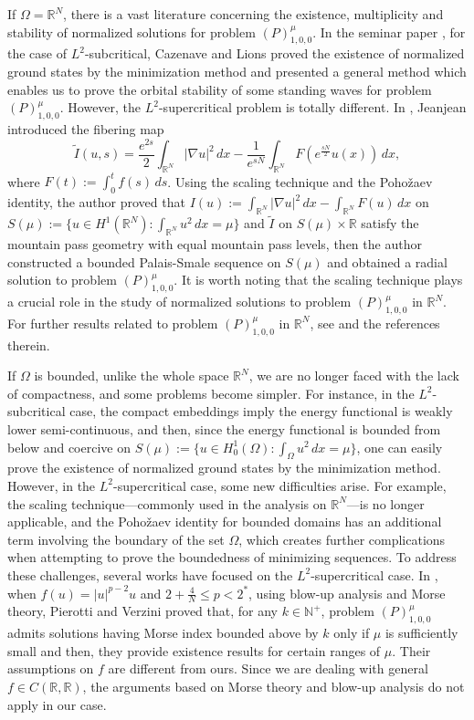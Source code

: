 \documentclass[11pt]{amsart}
\newcommand{\abs}[1]{\lvert#1\rvert}
\newcommand{\R}{\mathbb{R}}
\numberwithin{equation}{section}
\begin{document}
If $\Omega=\R^N$, there is a vast literature concerning the existence, multiplicity and stability of normalized solutions for problem $(P)^{\mu}_{1,0,0}$. In the seminar paper \cite{CL}, for the case of $L^{2}$-subcritical, Cazenave  and Lions proved the existence of normalized ground states by the minimization method and presented a general method which enables us to prove the orbital stability of some standing waves for problem $(P)^{\mu}_{1,0,0}$. However, the $L^{2}$-supercritical problem is
totally different. In \cite{jeanjean1}, Jeanjean introduced the fibering map
$$
\tilde{I}(u,s) = \frac{e^{2s}}{2}\int_{\R^N}\abs{\nabla u}^2\, dx-\frac{1}{e^{sN}}\int_{\R^N}F(e^\frac{sN}{2}u(x))\, dx,
$$
where $F(t):=\int_0^tf(s)\,ds$. Using the scaling technique and the Poho\v{z}aev identity, the author proved that $I(u):=\int_{\R^N}\abs{\nabla u}^2\, dx-\int_{\R^N}F(u)\, dx$ on $S(\mu):=\{u \in H^1(\R^N): \int_{\R^N}u^2\, dx=\mu\}$ and  $\tilde{I}$ on $S(\mu) \times\R$ satisfy the mountain pass geometry with equal mountain pass levels, then the author constructed a bounded Palais-Smale sequence on $S(\mu)$ and obtained a radial solution to problem $(P)^{\mu}_{1,0,0}$. It is worth noting that the scaling technique plays a crucial role  in the study of normalized solutions to problem $(P)^{\mu}_{1,0,0}$ in $\R^N$. For further results  related  to problem $(P)^{\mu}_{1,0,0}$ in $\R^N$,  see \cite{A21, CCM, AJ21, AlvesThin, BartschJeanjeanSaove, Bartschmolle, BartschSaove, valerio, Bartosz, BellazziniJeanjeanLuo, CazenaveLivro, Jun, jeanjean1, JeanjeanJendrejLeVisciglia, JeanjeanLu, JeanjeanLu2020, JeanjenaLu2, JeanjeanLe, Nicola1, Nicola2} and the references therein.



If $\Omega$ is bounded, unlike the whole space $\mathbb{R}^N$, we are no longer faced with the lack of compactness, and some problems become simpler. For instance, in the $L^2$-subcritical case, the compact embeddings imply the energy functional is weakly lower semi-continuous, and then, since the energy functional is bounded from below and coercive on $S(\mu):=\{u \in H^1_0(\Omega): \int_{\Omega}u^2\, dx=\mu\}$, one can easily prove the existence of normalized ground states by the minimization method. However, in the $L^2$-supercritical case, some new difficulties arise. For example, the scaling technique---commonly used in the analysis on $\mathbb{R}^N$---is no longer applicable, and the Poho\v{z}aev identity for bounded domains has an additional term involving the boundary of the set $\Omega$, which creates further complications when  attempting  to prove the boundedness of minimizing sequences.  To address these challenges, several works have focused on the $L^2$-supercritical case. In \cite{Darion}, when $f(u)=\abs{u}^{p-2}u$ and $2 +\frac{4}{N}\leq p <2^*$, using blow-up analysis and Morse theory, Pierotti and Verzini proved that, for any $k \in \mathbb{N}^+$, problem  $(P)^{\mu}_{1,0,0}$ admits solutions having Morse index bounded above by $k$ only if $\mu$ is sufficiently small and then, they provide existence results for certain ranges of $\mu$.
Their assumptions on $f$ are different from ours. Since we are dealing with general $f \in C(\R,\R)$,  the arguments based on Morse theory and blow-up analysis do not apply in our case.
\end{document}
